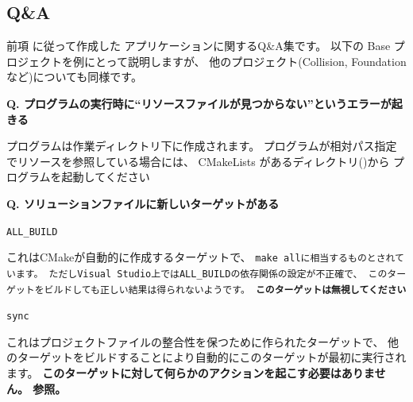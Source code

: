\subsection{Q\&A}
\label{subsec:QandA}
\parindent=0pt

前項 に従って作成した
アプリケーションに関するQ\&A集です。
以下\SprLib の Base プロジェクトを例にとって説明しますが、
他のプロジェクト(Collision, Foundationなど)についても同様です。

\bigskip

\thinrule{\linewidth}

\bf{Q. プログラムの実行時に“リソースファイルが見つからない”というエラーが起きる}

\medskip
プログラムは作業ディレクトリ\BldDir 下に作成されます。
プログラムが相対パス指定でリソースを参照している場合には、
CMakeLists{} があるディレクトリ()から
プログラムを起動してください

\thinrule{\linewidth}

\bf{Q. ソリューションファイルに新しいターゲットがある}

\tt{ALL\_BUILD}
\begin{narrow}
	これはCMakeが自動的に作成するターゲットで、
	\tt{make all}に相当するものとされています。
	ただしVisual Studio上では\tt{ALL\_BUILD}の依存関係の設定が不正確で、
	このターゲットをビルドしても正しい結果は得られないようです。
	\bf{このターゲットは無視してください}
\end{narrow}

\tt{sync}
\begin{narrow}
	これはプロジェクトファイルの整合性を保つために作られたターゲットで、
	他のターゲットをビルドすることにより自動的にこのターゲットが最初に実行されます。
	\bf{このターゲットに対して何らかのアクションを起こす必要はありません。}
	 参照。
\end{narrow}

\thinrule{\linewidth}

